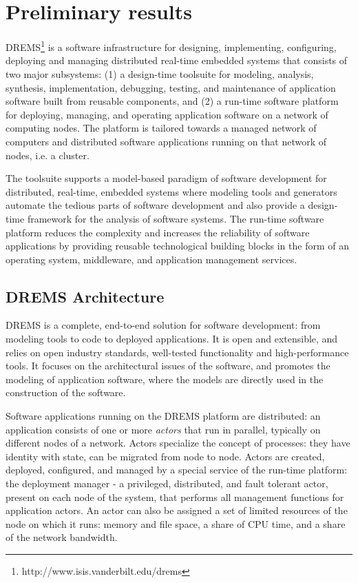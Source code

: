 \section{Preliminary results}
\label{sec:results}

DREMS\footnote{\vspace{-0.1in}http://www.isis.vanderbilt.edu/drems} is a software
infrastructure for designing, implementing, configuring, deploying and
managing distributed real-time embedded systems that consists of two
major subsystems: (1) a design-time toolsuite for modeling, analysis,
synthesis, implementation, debugging, testing, and maintenance of
application software built from reusable components, and (2) a
run-time software platform for deploying, managing, and operating
application software on a network of computing nodes. The platform is
tailored towards a managed network of computers and distributed
software applications running on that network of nodes, i.e. a cluster.

The toolsuite supports a model-based paradigm of software development
for distributed, real-time, embedded systems where modeling tools and
generators automate the tedious parts of software development and also
provide a design-time framework for the analysis of software
systems. The run-time software platform reduces the complexity and
increases the reliability of software applications by providing
reusable technological building blocks in the form of an operating
system, middleware, and application management services.

\subsection{DREMS Architecture}

DREMS is a complete, end-to-end solution for software development:
from modeling tools to code to deployed applications. It is open and
extensible, and relies on open industry standards, well-tested
functionality and high-performance tools. It focuses on the
architectural issues of the software, and promotes the modeling of
application software, where the models are directly used in the
construction of the software.

Software applications running on the DREMS platform are distributed:
an application consists of one or more \textit{actors} that run in parallel,
typically on different nodes of a network. Actors specialize the
concept of processes: they have identity with state, can be
migrated from node to node.  Actors are created,
deployed, configured, and managed by a special service of the run-time
platform: the deployment manager - a privileged, distributed, and
fault tolerant actor, present on each node of the system, that
performs all management functions for application actors. An actor can
also be assigned a set of limited resources of the node on which it runs:
memory and file space, a share of CPU time, and a share of the network
bandwidth.

